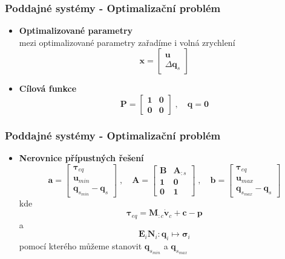 	\begin{frame}
		\frametitle{Poddajné systémy - Optimalizační problém}

		\begin{itemize}
			\item \textbf{Optimalizované parametry}\\
			mezi optimalizované parametry zařadíme i volná zrychlení
			\begin{equation*}
				\bm{x} = \begin{bmatrix} \bm{u} \\ \Delta\bm{q}_s \end{bmatrix}
			\end{equation*}
			\item \textbf{Cílová funkce}\\
			\begin{equation*}
				\bm{P}
				=
				\begin{bmatrix}
					\bm{1} & \bm{0} \\
					\bm{0} & \bm{0}
				\end{bmatrix}
				\;,\quad
				\bm{q} = \bm{0}
			\end{equation*}
		\end{itemize}
	\end{frame}

	\begin{frame}
		\frametitle{Poddajné systémy - Optimalizační problém}
		
		\begin{itemize}
			\item \textbf{Nerovnice přípustných řešení}\\
			\begin{equation*}
				\bm{a}
				=
				\begin{bmatrix}
					\bm{\tau}_{eq} \\
					\bm{u}_{min} \\
					\bm{q}_{s_{min}} - \bm{q}_s
				\end{bmatrix}
				\;,\quad 
				\bm{A}
				=
				\begin{bmatrix}
					\bm{B} & \bm{A}_{:s} \\
					\bm{1} & \bm{0} \\
					\bm{0} & \bm{1}
				\end{bmatrix}
				\;,\quad
				\bm{b}
				=
				\begin{bmatrix}
					\bm{\tau}_{eq} \\
					\bm{u}_{max} \\
					\bm{q}_{s_{max}} - \bm{q}_s
				\end{bmatrix}
			\end{equation*}
			kde
			\begin{equation*}
				\bm{\tau}_{eq} = \bm{M}_{:c} \bm{\dot{v}}_c + \bm{c} - \bm{p}
			\end{equation*}
			a
			\begin{equation*}
				\bm{E}_i\bm{N}_i : \bm{q}_i \mapsto \bm{\sigma}_i
			\end{equation*}
			pomocí kterého můžeme stanovit $\bm{q}_{s_{min}}$ a $\bm{q}_{s_{max}}$
		\end{itemize}
	\end{frame}